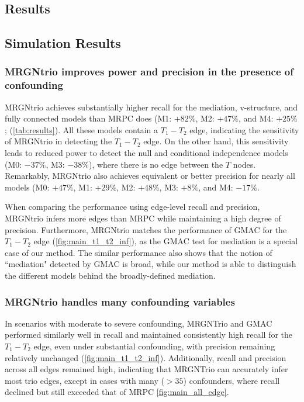 \documentclass[12pt,letterpaper]{report}
\begin{document}
\begin{doublespace}
\section{Results}

\subsection{Simulation Results}
\subsubsection*{MRGNtrio improves power and precision in the presence of confounding}

MRGNtrio achieves substantially higher recall for the mediation, v-structure, and fully connected models than MRPC does (M1: $+82\%$, M2: $+47\%$,  and M4: $+25\%$; (\autoref{tab:results}). All these models contain a $T_1 - T_2$ edge, indicating the sensitivity of MRGNtrio in detecting the $T_1 - T_2$ edge. On the other hand, this sensitivity leads to reduced power to detect the null and conditional independence models (M0: $-37\%$, M3: $-38\%$), where there is no edge between the $T$ nodes. Remarkably, MRGNtrio also achieves equivalent or better precision for nearly all models (M0: $+47\%$, M1: $+29\%$, M2: $+48\%$, M3: $+8\%$, and M4: $-17\%$. 

When comparing the performance using edge-level recall and precision, MRGNtrio infers more edges than MRPC while maintaining a high degree of precision. Furthermore, MRGNtrio matches the performance of GMAC for the $T_1 - T_2$ edge (\autoref{fig:main_t1_t2_inf}), as the GMAC test for mediation is a special case of our method. The similar performance also shows that the notion of ``mediation" detected by GMAC is broad, while our method is able to distinguish the different models behind the broadly-defined mediation. 

\subsubsection*{MRGNtrio handles many confounding variables}

In scenarios with moderate to severe confounding, MRGNTrio and GMAC performed similarly well in recall and maintained consistently high recall for the $T_1 - T_2$ edge, even under substantial confounding, with precision remaining relatively unchanged (\autoref{fig:main_t1_t2_inf}). Additionally, recall and precision across all edges remained high, indicating that MRGNTrio can accurately infer most trio edges, except in cases with many ($>35$) confounders, where recall declined but still exceeded that of MRPC \autoref{fig:main_all_edge}.


\end{doublespace}
\end{document}

